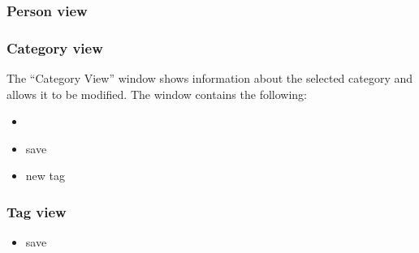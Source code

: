 \subsubsection{Person view}

\subsubsection{Category view}
The ``Category View'' window shows information about the selected category and allows it to be modified. The window contains the following: 

\begin{itemize}
	\item 
	\item save
	\item new tag
\end{itemize}

\subsubsection{Tag view}

\begin{itemize}
	\item save
\end{itemize}

